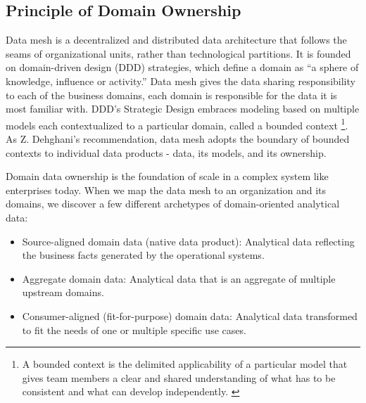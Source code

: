 \documentclass[12pt, a4paper]{book}
\begin{document}
\subsection{Principle of Domain Ownership}
Data mesh is a decentralized and distributed data architecture that follows the seams of organizational units, rather than technological partitions. It is founded on domain-driven design (DDD) strategies, which define a domain as “a sphere of knowledge, influence or activity.” Data mesh gives the data sharing responsibility to each of the business domains, each domain is responsible for the data it is most familiar with. DDD’s Strategic Design embraces modeling based on multiple models each contextualized to a particular domain, called a bounded context \footnote{A bounded context is the delimited applicability of a particular model that gives team members a clear and shared understanding of what has to be consistent and what can develop independently. \cite{dddevan}}. As Z. Dehghani’s recommendation, data mesh adopts the boundary of bounded contexts to individual data products - data, its models, and its ownership.

Domain data ownership is the foundation of scale in a complex system like enterprises today. When we map the data mesh to an organization and its domains, we discover a few different archetypes of domain-oriented analytical data:
	\begin{itemize}
		\item Source-aligned domain data (native data product): Analytical data reflecting the business facts generated by the operational systems.
		\item Aggregate domain data: Analytical data that is an aggregate of multiple upstream domains.
		\item Consumer-aligned (fit-for-purpose) domain data: Analytical data transformed to fit the needs of one or multiple specific use cases.
	\end{itemize}
\end{document}

